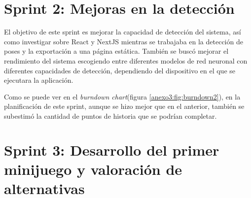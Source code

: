 

\section{Sprint 2: Mejoras en la detección}
\label{anexo3:sec:sprint2}

El objetivo de este sprint es mejorar la capacidad de detección del sistema, así como investigar
sobre React y NextJS mientras se trabajaba en la detección de poses y la exportación a una página
estática. También se buscó mejorar el rendimiento del sistema escogiendo entre diferentes modelos de
red neuronal con diferentes capacidades de detección, dependiendo del dispositivo en el que se ejecutara
la aplicación.

Como se puede ver en el \textit{burndown chart}(figura \ref{anexo3:fig:burndown2}), en la planificación de
este sprint, aunque se hizo mejor que en el anterior, también se subestimó la cantidad de puntos de
historia que se podrían completar.




\section{Sprint 3: Desarrollo del primer minijuego y valoración de alternativas}
\label{anexo3:sec:sprint3}

